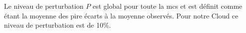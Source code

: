 \documentclass[a0paper,portrait]{tikzposter}
\begin{document}
\begin{columns}
{Le niveau de perturbation $P$ est global pour toute la \ac{mcs} et est définit
comme étant la moyenne des pire écarts à la moyenne observés. 
Pour notre Cloud ce niveau de perturbation est de 10\%.
} 
\end{columns}
\end{document}
